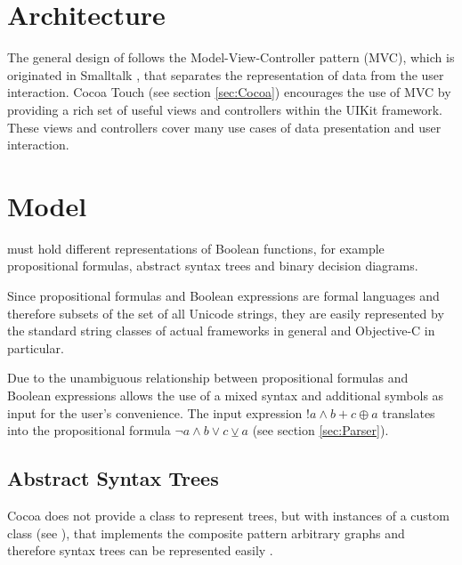 
\section{Architecture}

The general design of \Nyaya follows the Model-View-Controller pattern (MVC),
which is originated in Smalltalk \cite[p.4]{GAMMAETAL}, 
that separates the representation of data from the user interaction.
Cocoa Touch (see section \vref{sec:Cocoa}) encourages the use of MVC
by providing a rich set of useful views and controllers within the UIKit framework.
These views and controllers cover many use cases of data presentation and user interaction.

\section{Model}

\Nyaya must hold different representations of Boolean functions, 
for example propositional formulas, abstract syntax trees and binary decision diagrams. 

Since propositional formulas and Boolean expressions are formal languages 
and therefore subsets of the set of all Unicode strings,
they are easily represented by the standard string classes 
of actual frameworks in general and Objective-C in particular. 

Due to the unambiguous relationship between propositional formulas and Boolean expressions 
\Nyaya allows the use of a mixed syntax and additional symbols as input
for the user's convenience. The input expression $!a \wedge b + c \oplus a$ 
translates into the propositional formula
$\neg a \wedge b \vee c \veebar a$ (see section \vref{sec:Parser}).

\subsection{Abstract Syntax Trees}
\label{sec:AST}

Cocoa does not provide a class to represent trees, 
but with instances of a custom class (see ), 
that implements the composite pattern \cite[p.163ff]{GAMMAETAL}
arbitrary graphs and therefore syntax trees can be represented easily .

